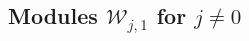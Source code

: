 \documentclass[a4paper,10pt]{article}
\newcommand{\q}{\mathfrak{q}}
\newcommand{\linnea}[1]{$\framebox{\tiny L}$\ \textbf{\texttt{{\color{red}\footnotesize#1}}}}
\newcommand{\jesper}[1]{$\framebox{\tiny J}$\ \textbf{\texttt{{\color{cyan}\footnotesize#1}}}}
\newcommand{\aSt}{\mathcal{W}}
\newcommand{\AStTL}[2]{\aSt_{#1,#2}}
\newcommand{\Verma}[1]{\mathsf{V}_{#1}}
\newcommand{\FF}[1]{\widetilde{\mathsf{V}}_{#1}}
\begin{document}
%









\subsection{Modules $\AStTL{j}{1}$ for $j \neq 0$}
\end{document}
